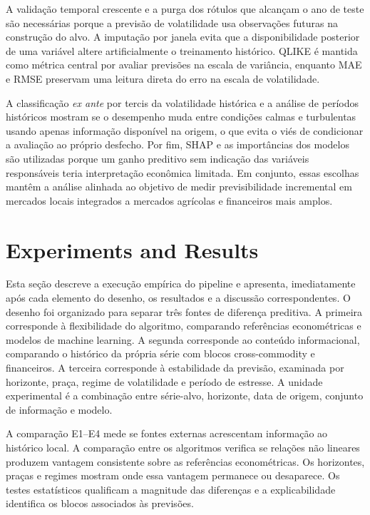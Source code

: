 \documentclass[a4paper,fleqn]{cas-sc}
\begin{document}
A validação temporal crescente e a purga dos rótulos que alcançam o ano de teste são necessárias porque a previsão de volatilidade usa observações futuras na construção do alvo. A imputação por janela evita que a disponibilidade posterior de uma variável altere artificialmente o treinamento histórico. QLIKE é mantida como métrica central por avaliar previsões na escala de variância, enquanto MAE e RMSE preservam uma leitura direta do erro na escala de volatilidade.

A classificação \textit{ex ante} por tercis da volatilidade histórica e a análise de períodos históricos mostram se o desempenho muda entre condições calmas e turbulentas usando apenas informação disponível na origem, o que evita o viés de condicionar a avaliação ao próprio desfecho. Por fim, SHAP e as importâncias dos modelos são utilizadas porque um ganho preditivo sem indicação das variáveis responsáveis teria interpretação econômica limitada. Em conjunto, essas escolhas mantêm a análise alinhada ao objetivo de medir previsibilidade incremental em mercados locais integrados a mercados agrícolas e financeiros mais amplos.

\section{Experiments and Results}
\label{sec:experiments}

Esta seção descreve a execução empírica do pipeline e apresenta, imediatamente após cada elemento do desenho, os resultados e a discussão correspondentes. O desenho foi organizado para separar três fontes de diferença preditiva. A primeira corresponde à flexibilidade do algoritmo, comparando referências econométricas e modelos de machine learning. A segunda corresponde ao conteúdo informacional, comparando o histórico da própria série com blocos cross-commodity e financeiros. A terceira corresponde à estabilidade da previsão, examinada por horizonte, praça, regime de volatilidade e período de estresse. A unidade experimental é a combinação entre série-alvo, horizonte, data de origem, conjunto de informação e modelo.

A comparação E1--E4 mede se fontes externas acrescentam informação ao histórico local. A comparação entre os algoritmos verifica se relações não lineares produzem vantagem consistente sobre as referências econométricas. Os horizontes, praças e regimes mostram onde essa vantagem permanece ou desaparece. Os testes estatísticos qualificam a magnitude das diferenças e a explicabilidade identifica os blocos associados às previsões.
\end{document}
